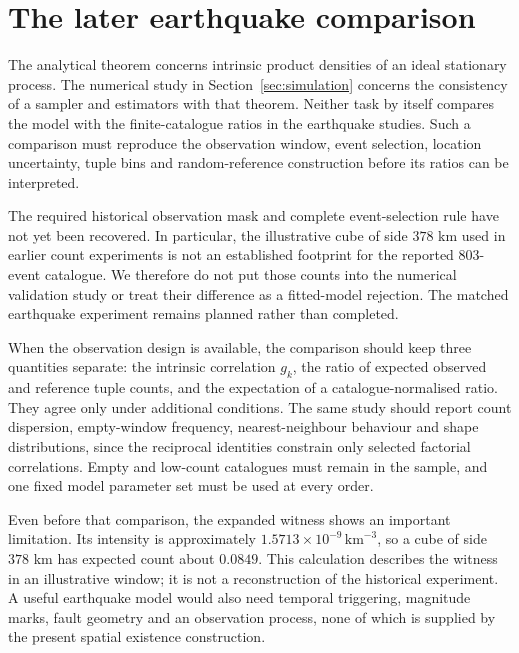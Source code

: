 \section{The later earthquake comparison}
\label{sec:earthquake-comparison}

The analytical theorem concerns intrinsic product densities of an ideal stationary process. The numerical study in Section~\ref{sec:simulation} concerns the consistency of a sampler and estimators with that theorem. Neither task by itself compares the model with the finite-catalogue ratios in the earthquake studies. Such a comparison must reproduce the observation window, event selection, location uncertainty, tuple bins and random-reference construction before its ratios can be interpreted.

The required historical observation mask and complete event-selection rule have not yet been recovered. In particular, the illustrative cube of side $378$ km used in earlier count experiments is not an established footprint for the reported $803$-event catalogue. We therefore do not put those counts into the numerical validation study or treat their difference as a fitted-model rejection. The matched earthquake experiment remains planned rather than completed.

When the observation design is available, the comparison should keep three quantities separate: the intrinsic correlation $g_k$, the ratio of expected observed and reference tuple counts, and the expectation of a catalogue-normalised ratio. They agree only under additional conditions. The same study should report count dispersion, empty-window frequency, nearest-neighbour behaviour and shape distributions, since the reciprocal identities constrain only selected factorial correlations. Empty and low-count catalogues must remain in the sample, and one fixed model parameter set must be used at every order.

Even before that comparison, the expanded witness shows an important limitation. Its intensity is approximately $1.5713\times10^{-9}\,\mathrm{km}^{-3}$, so a cube of side $378$ km has expected count about $0.0849$. This calculation describes the witness in an illustrative window; it is not a reconstruction of the historical experiment. A useful earthquake model would also need temporal triggering, magnitude marks, fault geometry and an observation process, none of which is supplied by the present spatial existence construction.
